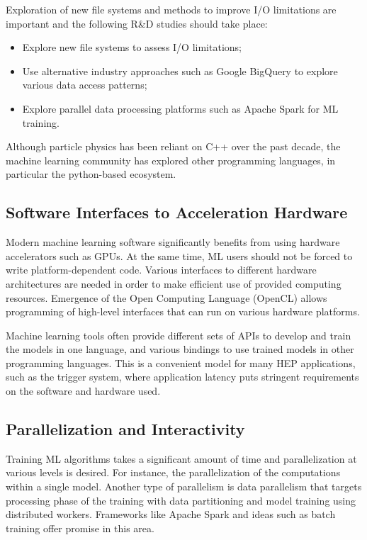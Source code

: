 
Exploration of new file systems and methods to improve I/O limitations are important and the following R\&D studies should take place:
\begin{itemize}
 \item Explore new file systems to assess I/O limitations;
 \item Use alternative industry approaches such as Google BigQuery to explore various data access patterns;
 \item Explore parallel data processing platforms such as Apache Spark for ML training.
\end{itemize}

Although particle physics has been reliant on C++ over the past decade, the machine learning community has explored other programming languages, in particular the python-based ecosystem.

\subsection{Software Interfaces to Acceleration Hardware}
\label{sec:software_proglang}
Modern machine learning software significantly benefits from using hardware accelerators such as GPUs. At the same time, ML users should not be forced to write platform-dependent code. Various interfaces to different hardware architectures are needed in order to make efficient use of provided computing resources. Emergence of the Open Computing Language (OpenCL) allows programming of high-level interfaces that can run on various hardware platforms.

Machine learning tools often provide different sets of APIs to develop and train the models in one language, and various bindings to use trained models in other programming languages. This is a convenient model for many HEP applications, such as the trigger system, where application latency puts stringent requirements on the software and hardware used.

\subsection{Parallelization and Interactivity}
Training ML algorithms takes a significant amount of time and parallelization at various levels is desired. For instance, the parallelization of the computations within a single model. Another type of parallelism is data parallelism that targets processing phase of the training with data partitioning and model training using distributed workers. Frameworks like Apache Spark and ideas such as batch training offer promise in this area.

